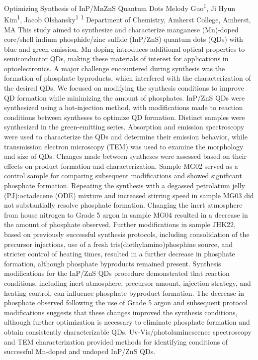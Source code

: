 \makeabstract
    {
    Optimizing Synthesis of InP/MnZnS Quantum Dots
    }
    {
    Melody Guo\textsuperscript{1}, Ji Hyun Kim\textsuperscript{1}, Jacob Olshansky\textsuperscript{1}
    }
    {
    \textsuperscript{1} Department of Chemistry, Amherst College, Amherst, MA
    }
    {
    This study aimed to synthesize and characterize manganese (Mn)-doped core/shell indium phosphide/zinc sulfide (InP/ZnS) quantum dots (QDs) with blue and green emission. Mn doping introduces additional optical properties to semiconductor QDs, making these materials of interest for applications in optoelectronics. A major challenge encountered during synthesis was the formation of phosphate byproducts, which interfered with the characterization of the desired QDs. We focused on modifying the synthesis conditions to improve QD formation while minimizing the amount of phosphates.
    }
    {
    InP/ZnS QDs were synthesized using a hot-injection method, with modifications made to reaction conditions between syntheses to optimize QD formation. Distinct samples were synthesized in the green-emitting series. Absorption and emission spectroscopy were used to characterize the QDs and determine their emission behavior, while transmission electron microscopy (TEM) was used to examine the morphology and size of QDs. Changes made between syntheses were assessed based on their effects on product formation and characterization. 
    }
    {
    Sample MG02 served as a control sample for comparing subsequent modifications and showed significant phosphate formation. Repeating the synthesis with a degassed petrolatum jelly (PJ):octadecene (ODE) mixture and increased stirring speed in sample MG03 did not substantially resolve phosphate formation. Changing the inert atmosphere from house nitrogen to Grade 5 argon in sample MG04 resulted in a decrease in the amount of phosphate observed. Further modifications in sample JHK22, based on previously successful synthesis protocols, including consolidation of the precursor injections, use of a fresh tris(diethylamino)phosphine source, and stricter control of heating times, resulted in a further decrease in phosphate formation, although phosphate byproducts remained present. 
    }
    {
    Synthesis modifications for the InP/ZnS QDs procedure demonstrated that reaction conditions, including inert atmosphere, precursor amount, injection strategy, and heating control, can influence phosphate byproduct formation. The decrease in phosphate observed following the use of Grade 5 argon and subsequent protocol modifications suggests that these changes improved the synthesis conditions, although further optimization is necessary to eliminate phosphate formation and obtain consistently characterizable QDs. Uv-Vis/photoluminescence spectroscopy and TEM characterization provided methods for identifying conditions of successful Mn-doped and undoped InP/ZnS QDs.
    }

    \newpage
    